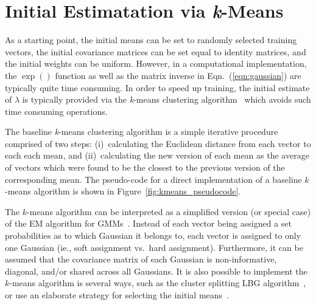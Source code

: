 \section{Initial Estimatation via {\it k}-Means}
\label{sec:initial_estimate}

As a starting point, the initial means can be set to randomly selected training vectors,
the initial covariance matrices can be set equal to identity matrices, 
and the initial weights can be uniform.
However, in a computational implementation, the $\exp()$ function as well as the matrix inverse in Eqn.~(\ref{eqn:gaussian}) are typically quite time consuming.
In order to speed up training, the initial estimate of $\lambda$ is typically provided via the {\it k}-means clustering algorithm~\cite{Bishop_2006,Duda01,Kulis_2012}
which avoids such time consuming operations.

The baseline {\it k}-means clustering algorithm is a simple iterative procedure comprised of two steps:
(i)~calculating the Euclidean distance from each vector to each each mean,
and
(ii)~calculating the new version of each mean as the average of vectors which were found to be the closest to the previous version of the corresponding mean.
The pseudo-code for a direct implementation of a baseline $k$-means algorithm is shown in Figure~\ref{fig:kmeans_pseudocode}.

The $k$-means algorithm can be interpreted as a simplified version (or special case) of the EM algorithm for GMMs~\cite{Kulis_2012}.
Instead of each vector being assigned a set probabilities as to which Gaussian it belongs to,
each vector is assigned to only one Gaussian (ie., soft assignment vs.~hard assignment).
Furthermore, it can be assumed that the covariance matrix of each Gaussian is non-informative, diagonal, and/or shared across all Gaussians.
It is also possible to implement the $k$-means algorithm is several ways,
such as the cluster splitting LBG algorithm~\cite{Linde80},
or use an elaborate strategy for selecting the initial means~\cite{Arthur_2007}.

